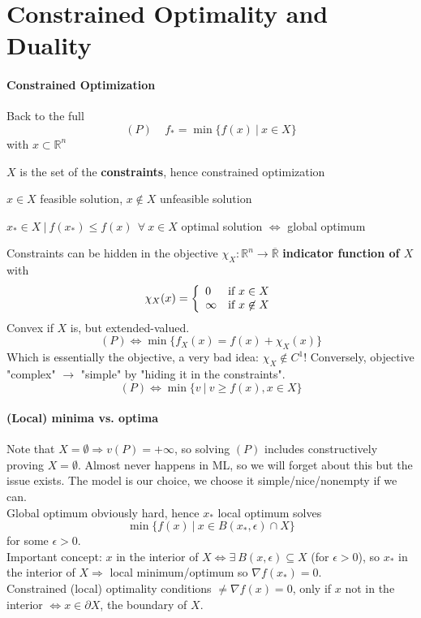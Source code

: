 \documentclass[10pt]{report}
\begin{document}
\section{Constrained Optimality and Duality}
\paragraph{Constrained Optimization} Back to the full $$(P)\:\:\:\:\:f_* = \min\{f(x)\:|\:x\in X\}$$ with $x\subset \mathbb{R}^n$\begin{list}{}{}
	\item $X$ is the set of the \textbf{constraints}, hence constrained optimization
	\item $x\in X$ feasible solution, $x\not\in X$ unfeasible solution
	\item $x_*\in X\:|\:f(x_*)\leq f(x)\:\:\forall\:x\in X$ optimal solution $\Leftrightarrow$ global optimum
\end{list}
Constraints can be hidden in the objective $\chi_X : \mathbb{R}^n\rightarrow \overline{\mathbb{R}}$ \textbf{indicator function of $X$} with $$\chi_X(x)=\left\{\begin{array}{l l}
0&\text{if }x\in X\\
\infty&\text{if }x\not\in X
\end{array}\right.$$ Convex if $X$ is, but extended-valued.
$$(P)\Leftrightarrow \min\{f_X(x)=f(x)+\chi_X(x)\}$$ Which is essentially the objective, a very bad idea: $\chi_X\not\in C^1$! Conversely, objective "complex" $\rightarrow$ "simple" by "hiding it in the constraints".
$$(P)\Leftrightarrow\min\{v\:|\:v\geq f(x), x\in X\}$$
\paragraph{(Local) minima vs. optima} Note that $X=\emptyset\Rightarrow v(P) = +\infty$, so solving $(P)$ includes constructively proving $X=\emptyset$. Almost never happens in ML, so we will forget about this but the issue exists. The model is our choice, we choose it simple/nice/nonempty if we can.\\
Global optimum obviously hard, hence $x_*$ local optimum solves $$\min\{f(x)\:|\:x\in B(x_*,\epsilon)\cap X\}$$ for some $\epsilon>0$.\\
Important concept: $x$ in the interior of $X\Leftrightarrow\exists\:B(x,\epsilon)\subseteq X$ (for $\epsilon>0$), so $x_*$ in the interior of $X\Rightarrow$ local minimum/optimum so $\nabla f(x_*)=0$.\\
Constrained (local) optimality conditions $\neq\nabla f(x)=0$, only if $x$ not in the interior $\Leftrightarrow x\in \partial X$, the boundary of $X$.
\end{document}
